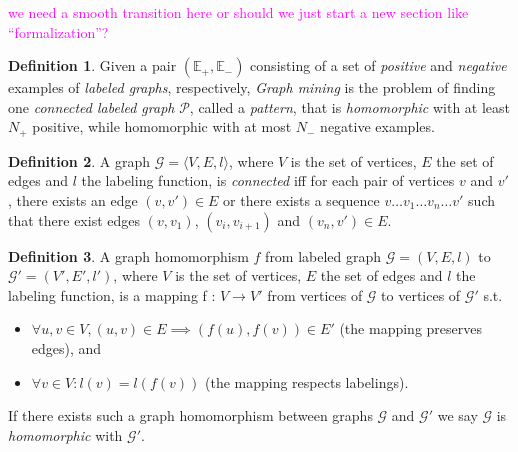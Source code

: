 \documentclass{article}
\theoremstyle{definition}
\newtheorem{definition}{Definition}[section]
\newcommand{\triple}[1]{\ensuremath{\langle #1 \rangle}}
\newcommand{\pair}[1]{\ensuremath{\left(#1\right)}}
\newcommand{\graph}[1]{\ensuremath{\mathcal{#1}}}
\newcommand{\graphset}[1]{\ensuremath{\mathbb{#1}}}
\newcommand{\sergey}[1]{\textcolor{magenta}{\marginpar{\sc Sergey} #1}}
\begin{document}
\sergey{we need a smooth transition here or should we just start a new section like ``formalization''?}

\begin{definition}
\label{def:GM1}
Given a pair $\pair{\graphset{E}_{+},\graphset{E}_{-}}$ consisting of a set of \emph{positive} and \emph{negative} examples of \emph{labeled graphs}, respectively,
\emph{Graph mining} is the problem of finding one \emph{connected labeled graph} $\graph{P}$, called a \emph{pattern},
that is \emph{homomorphic} with at least $N_{+}$ positive, while homomorphic with at most $N_{-}$ negative examples.
\end{definition}

\begin{definition}
A graph $\graph{G} = \triple{V,E,l}$, where $V$ is the set of vertices, $E$ the set of edges and $l$ the labeling function, is \emph{connected} iff for each pair of vertices $v$ and $v'$, there exists an edge $\pair{v,v'} \in E$ or there exists a sequence $v \ldots v_{1} \ldots v_{n} \ldots v'$ such that there exist edges $\pair{v,v_{1}}$, $\pair{v_{i},v_{i+1}}$ and $\pair{v_{n},v'} \in E$.
\end{definition}


\begin{definition}
A graph homomorphism $f$ from labeled graph $\graph{G} = (V,E,l)$ to $\graph{G}' = (V',E',l')$, where $V$ is the set of vertices, $E$ the set of edges and $l$ the labeling function, is a mapping f : $V \rightarrow V'$ from vertices of $\graph{G}$ to vertices of $\graph{G'}$ s.t. 
\begin{itemize}
\item $\forall u,v \in V, \pair{u,v} \in E \implies \pair{f(u),f(v)} \in E'$ (the mapping preserves edges), and 
\item $\forall v \in V : l(v) = l(f(v))$ (the mapping respects labelings).
\end{itemize}
If there exists such a graph homomorphism between graphs $\graph{G}$ and $\graph{G'}$ we say $\graph{G}$ is \emph{homomorphic} with $\graph{G'}$.
\end{definition}
\end{document}
